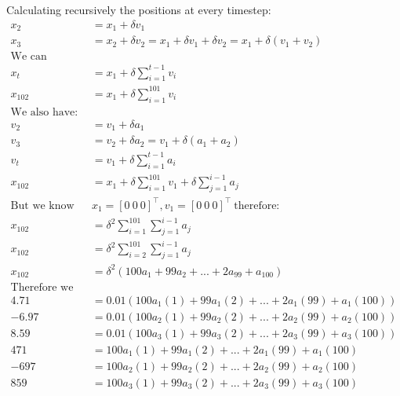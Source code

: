 \documentclass[11pt,a4paper,oneside]{report}
\begin{document}
Calculating recursively the positions at every timestep:
\begin{align*}
x_2 &= x_1 + \delta v_1\\
x_3 &= x_2 + \delta v_2 = x_1 + \delta v_1 + \delta v_2 = x_1 + \delta (v_1+v_2)\\
\text{We can therefore derive that:}&\\
x_t &= x_1 + \delta \sum_{i=1}^{t-1}v_i\\
x_{102} &= x_1 + \delta \sum_{i=1}^{101}v_i\\
\text{We also have:}&\\
v_2 &= v_1 + \delta a_1\\
v_3 &= v_2 + \delta a_2 = v_1 + \delta (a_1+a_2)\\
v_t &= v_1 + \delta \sum_{i=1}^{t-1}a_i\\
x_{102} &= x_1 + \delta \sum_{i=1}^{101} v_1 + \delta \sum_{j=1}^{i-1}a_j\\
\text{But we know that:}\ & x_1 = [ 0\ 0\ 0 ]^\top, v_1 = [0\ 0\ 0]^\top \ \text{therefore:} \\
x_{102} &= \delta^2 \sum_{i=1}^{101}\sum_{j=1}^{i-1}a_j\\
x_{102} &= \delta^2 \sum_{i=2}^{101}\sum_{j=1}^{i-1}a_j\\
x_{102} &= \delta^2 (100a_1+99a_2+...+2a_{99}+a_{100})\\
\text{Therefore we have that:}&\\
4.71 &= 0.01(100a_1(1)+99a_1(2)+...+2a_1(99)+a_1(100))\\
-6.97 &= 0.01(100a_2(1)+99a_2(2)+...+2a_2(99)+a_2(100))\\
8.59 &= 0.01(100a_3(1)+99a_3(2)+...+2a_3(99)+a_3(100))\\
471 &= 100a_1(1)+99a_1(2)+...+2a_1(99)+a_1(100)\\
-697 &= 100a_2(1)+99a_2(2)+...+2a_2(99)+a_2(100)\\
859 &= 100a_3(1)+99a_3(2)+...+2a_3(99)+a_3(100)\\
\end{align*}
\end{document}
